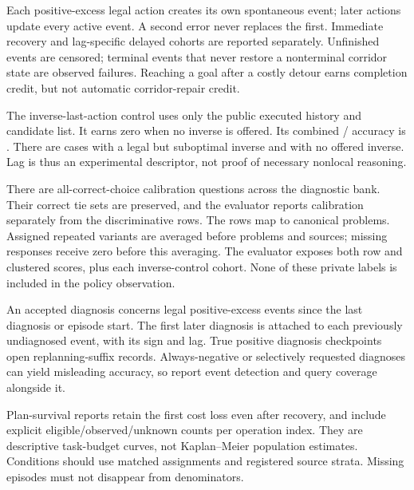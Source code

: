 \begin{table}[t]
\centering\small
\caption{Delayed-repair lag and public inverse-last control.}

\end{table}

Each positive-excess legal action creates its own spontaneous event;
later actions update every active event. A second error never replaces
the first. Immediate recovery and lag-specific delayed cohorts are
reported separately. Unfinished events are censored; terminal events
that never restore a nonterminal corridor state are observed failures.
Reaching a goal after a costly detour earns completion credit, but not
automatic corridor-repair credit.

The inverse-last-action control uses only the public executed history
and candidate list. It earns zero when no inverse is offered.
Its combined \InverseCorrect{}/\RepairCount{} accuracy is
\InverseAccuracy{}. There are \InverseSuboptimal{} cases with a legal
but suboptimal inverse and \InverseUnavailable{} with no offered inverse. Lag is thus an
experimental descriptor, not proof of necessary nonlocal reasoning.

There are \CalibrationCount{} all-correct-choice calibration questions across the
diagnostic bank. Their correct tie sets are preserved, and the evaluator
reports calibration separately from the \DiscriminativeCount{} discriminative rows.
The \ProbeCount{} rows map to \ProblemCount{} canonical problems. Assigned repeated variants
are averaged before problems and sources; missing responses receive
zero before this averaging. The evaluator exposes both row and clustered
scores, plus each inverse-control cohort. None of these private labels
is included in the policy observation.

\begin{table}[t]
\centering\small
\caption{Recovery cohorts are not pooled into a claim of nonlocal repair.}

\end{table}

An accepted diagnosis concerns legal positive-excess events since the
last diagnosis or episode start. The first later diagnosis is attached
to each previously undiagnosed event, with its sign and lag. True
positive diagnosis checkpoints open replanning-suffix records.
Always-negative or selectively requested diagnoses can yield misleading
accuracy, so report event detection and query coverage alongside it.

Plan-survival reports retain the first cost loss even after recovery,
and include explicit eligible/observed/unknown counts per operation index.
They are descriptive task-budget curves, not Kaplan--Meier population
estimates. Conditions should use matched assignments and registered
source strata. Missing episodes must not disappear from denominators.

